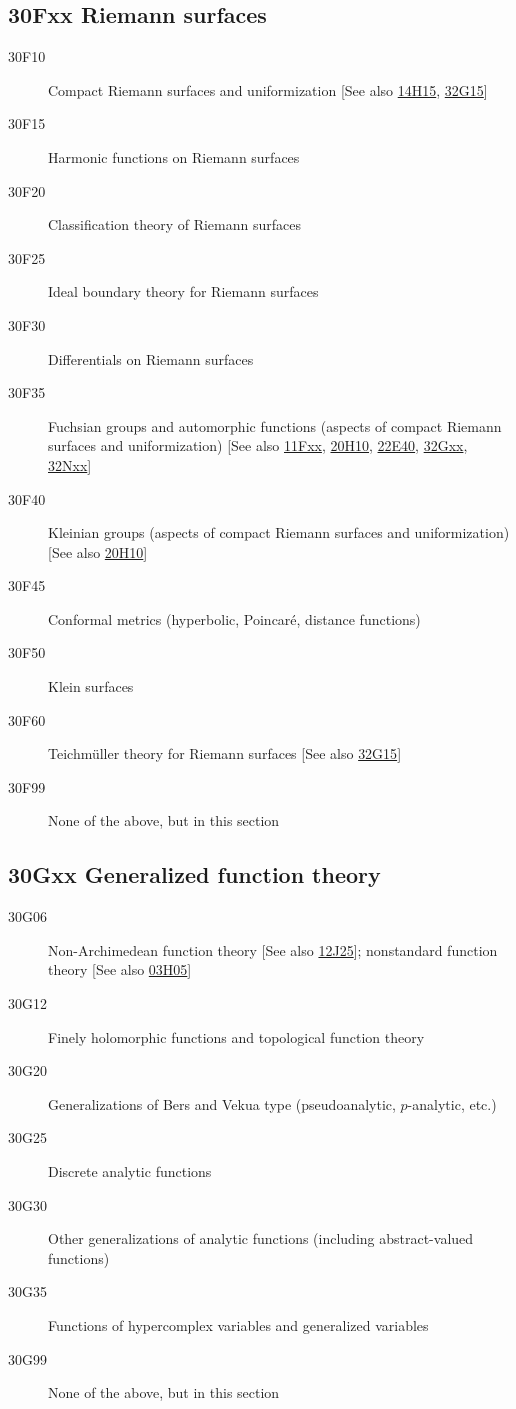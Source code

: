 \subsection*{30Fxx  Riemann surfaces }\label{30Fxx}
\begin{description}  
\item [30F10]\label{30F10} Compact Riemann surfaces and uniformization [See also \hyperref[14H15]{14H15}, \hyperref[32G15]{32G15}]
\item [30F15]\label{30F15} Harmonic functions on Riemann surfaces
\item [30F20]\label{30F20} Classification theory of Riemann surfaces
\item [30F25]\label{30F25} Ideal boundary theory for Riemann surfaces
\item [30F30]\label{30F30} Differentials on Riemann surfaces
\item [30F35]\label{30F35} Fuchsian groups and automorphic functions (aspects of compact Riemann surfaces and uniformization) [See also \hyperref[11Fxx]{11Fxx}, \hyperref[20H10]{20H10}, \hyperref[22E40]{22E40}, \hyperref[32Gxx]{32Gxx}, \hyperref[32Nxx]{32Nxx}]
\item [30F40]\label{30F40} Kleinian groups (aspects of compact Riemann surfaces and uniformization) [See also \hyperref[20H10]{20H10}]
\item [30F45]\label{30F45} Conformal metrics (hyperbolic, Poincar\'{e}, distance functions)
\item [30F50]\label{30F50} Klein surfaces
\item [30F60]\label{30F60} Teichm\"{u}ller theory for Riemann surfaces [See also \hyperref[32G15]{32G15}]
\item [30F99]\label{30F99} None of the above, but in this section
\end{description}
\subsection*{30Gxx  Generalized function theory }\label{30Gxx}
\begin{description}  
\item [30G06]\label{30G06} Non-Archimedean function theory [See also \hyperref[12J25]{12J25}]; nonstandard function theory [See also \hyperref[03H05]{03H05}]
\item [30G12]\label{30G12} Finely holomorphic functions and topological function theory
\item [30G20]\label{30G20} Generalizations of Bers and  Vekua type (pseudoanalytic, $p$-analytic, etc.)
\item [30G25]\label{30G25} Discrete analytic functions
\item [30G30]\label{30G30} Other generalizations of analytic functions (including abstract-valued functions)
\item [30G35]\label{30G35} Functions of hypercomplex variables and generalized variables
\item [30G99]\label{30G99} None of the above, but in this section
\end{description}
